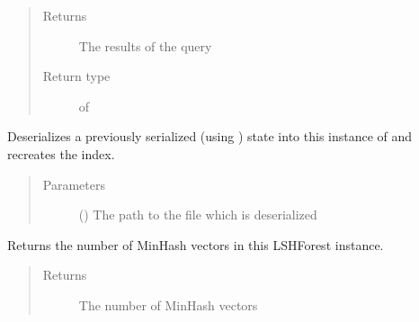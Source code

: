 \documentclass[letterpaper,10pt,english]{sphinxmanual}
\begin{document}
\begin{fulllineitems}
\begin{fulllineitems}
\begin{quote}
\begin{description}
\begin{itemize}
\end{itemize}

\item[{Returns}] \leavevmode
The results of the query

\item[{Return type}] \leavevmode
{} of 

\end{description}\end{quote}

\end{fulllineitems}


\begin{fulllineitems}
\label{\detokenize{documentation:tmap.LSHForest.restore}}
Deserializes a previously serialized (using {\hyperref[\detokenize{documentation:tmap.LSHForest.store}]{}}) state into this instance of {\hyperref[\detokenize{documentation:tmap.LSHForest}]{}} and recreates the index.
\begin{quote}\begin{description}
\item[{Parameters}] \leavevmode
{} () \textendash{} The path to the file which is deserialized

\end{description}\end{quote}

\end{fulllineitems}


\begin{fulllineitems}
\label{\detokenize{documentation:tmap.LSHForest.size}}
Returns the number of MinHash vectors in this LSHForest instance.
\begin{quote}\begin{description}
\item[{Returns}] \leavevmode
The number of MinHash vectors


\end{description}
\end{quote}
\end{fulllineitems}
\end{fulllineitems}
\end{document}
